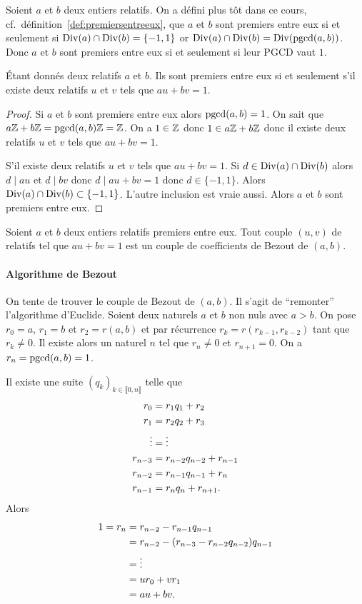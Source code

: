 Soient $a$ et $b$ deux entiers relatifs. On a défini plus tôt dans ce cours, cf.\ définition~\ref{def:premiersentreeux}, que $a$ et $b$ sont premiers entre eux si et seulement si $\operatorname{Div}(a) \cap \operatorname{Div}(b)=\{-1,1\}$ or $\operatorname{Div}(a) \cap \operatorname{Div}(b) = \operatorname{Div}(\operatorname{pgcd}(a,b))$. Donc $a$ et $b$ sont premiers entre eux si et seulement si leur PGCD vaut $1$.

\begin{theo}
  Étant donnés deux relatifs $a$ et $b$. Ils sont premiers entre eux si et seulement s'il existe deux relatifs $u$ et $v$ tels que $au+bv=1$.
\end{theo}
\begin{proof}
  Si $a$ et $b$ sont premiers entre eux alors $\operatorname{pgcd}(a,b) =1$. %
  On sait que $a\mathbb{Z}+b\mathbb{Z}=\operatorname{pgcd}(a,b)\mathbb{Z}=\mathbb{Z}$. On a $1 \in \mathbb{Z}$ donc $1 \in a\mathbb{Z}+b\mathbb{Z}$ donc il existe deux relatifs $u$ et $v$ tels que $au+bv=1$.

  S'il existe deux relatifs $u$ et $v$ tels que $au+bv=1$. Si $d \in \operatorname{Div}(a) \cap \operatorname{Div}(b)$ alors $d \mid au$ et $d \mid bv$ donc $d \mid au+bv=1$ donc $d \in \{-1,1\}$. Alors $\operatorname{Div}(a) \cap \operatorname{Div}(b) \subset \{-1,1\}$. L'autre inclusion est vraie aussi. Alors $a$ et $b$ sont premiers entre eux.
\end{proof}

\begin{defdef}
  Soient $a$ et $b$ deux entiers relatifs premiers entre eux. Tout couple $(u,v)$ de relatifs tel que $au+bv=1$ est un couple de coefficients de Bezout de $(a,b)$.
\end{defdef}

\paragraph{Algorithme de Bezout}

On tente de trouver le couple de Bezout de $(a,b)$. Il s'agit de ``remonter'' l'algorithme d'Euclide. Soient deux naturels $a$ et $b$ non nuls avec $a>b$. On pose $r_0=a$, $r_1=b$ et $r_2=r(a,b)$ et par récurrence $r_k=r(r_{k-1}, r_{k-2})$ tant que $r_k \neq 0$. Il existe alors un naturel $n$ tel que $r_n \neq 0$ et $r_{n+1}=0$. On a $r_n=\operatorname{pgcd}(a,b)=1$.

Il existe une suite $(q_k)_{k \in \llbracket 0, n \rrbracket}$ telle que
\begin{align}
  r_0 &= r_1 q_1+r_2 \\
  r_1 &= r_2 q_2+r_3 \\
  \vdots &= \vdots \notag \\
  r_{n-3} &=r_{n-2} q_{n-2}+ r_{n-1} \\
  r_{n-2} &=r_{n-1} q_{n-1}+ r_{n} \\
  r_{n-1} &=r_{n} q_{n}+ r_{n+1}. 
\end{align}
Alors
\begin{align}
  1=r_n&=r_{n-2} -r_{n-1}q_{n-1} \\
  &=r_{n-2} - (r_{n-3} -r_{n-2}q_{n-2})q_{n-1}\\
  &= \vdots \notag \\
  &=ur_0 + vr_1\\
  &=au+bv.
\end{align}

